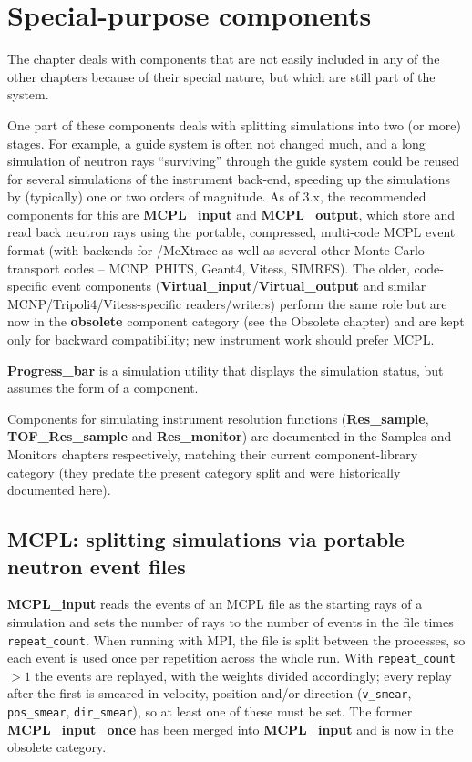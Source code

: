 \chapter{Special-purpose components}

The chapter deals with components that are not easily included
in any of the other chapters because of their special nature,
but which are still part of the \MCS system.

One part of these components deals with splitting simulations
into two (or more) stages. For example, a guide system is often
not changed much, and a long simulation of neutron rays
``surviving'' through the guide system could be reused
for several simulations of the instrument back-end, speeding up
the simulations by (typically) one or two orders of magnitude.
As of \MCS 3.x, the recommended components for this are
\textbf{MCPL\_input} and \textbf{MCPL\_output}, which store and read back
neutron rays using the portable, compressed, multi-code MCPL event format
(with backends for \MCS/McXtrace as well as several other Monte Carlo
transport codes -- MCNP, PHITS, Geant4, Vitess, SIMRES). The older,
code-specific event components (\textbf{Virtual\_input}/\textbf{Virtual\_output}
and similar MCNP/Tripoli4/Vitess-specific readers/writers) perform the same
role but are now in the \textbf{obsolete} component category (see the
Obsolete chapter) and are kept only for backward compatibility; new
instrument work should prefer MCPL.

\textbf{Progress\_bar} is a simulation utility that displays the simulation
status, but assumes the form of a component.

Components for simulating instrument resolution functions
(\textbf{Res\_sample}, \textbf{TOF\_Res\_sample} and \textbf{Res\_monitor})
are documented in the Samples and Monitors chapters respectively, matching
their current component-library category (they predate the present
category split and were historically documented here).

\newpage
\section{MCPL: splitting simulations via portable neutron event files}
\label{s:mcpl}
\textbf{MCPL\_input} reads the events of an MCPL file as the starting
rays of a simulation and sets the number of rays to the number of events
in the file times \texttt{repeat\_count}. When running with MPI, the file
is split between the processes, so each event is used once per repetition
across the whole run. With \texttt{repeat\_count}$>1$ the events are
replayed, with the weights divided accordingly; every replay after the
first is smeared in velocity, position and/or direction
(\texttt{v\_smear}, \texttt{pos\_smear}, \texttt{dir\_smear}), so at
least one of these must be set. The former \textbf{MCPL\_input\_once}
has been merged into \textbf{MCPL\_input} and is now in the obsolete
category.

